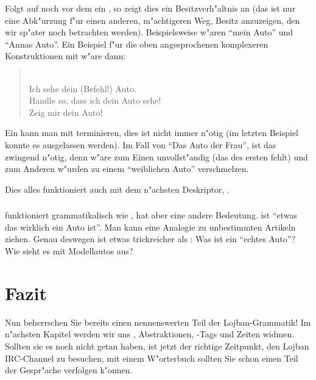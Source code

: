 Folgt auf  noch vor dem  ein , so zeigt dies ein Besitzverh"altnis an (das ist nur eine Abk"urzung f"ur einen
anderen, m"achtigeren Weg, Besitz anzuzeigen, den wir sp"ater noch betrachten werden). Beispielsweise w"aren  ``mein Auto'' und
 ``Annas Auto''. 
Ein Beispiel f"ur die oben angesprochenen komplexeren Konstruktionen mit  w"are dann:
\begin{quote}
 \\
Ich sehe dein (Befehl!) Auto. \\
Handle so, dass ich dein Auto sehe! \\
Zeig mir dein Auto!
\end{quote}

Ein  kann man mit  terminieren, dies ist nicht immer n"otig (im letzten Beispiel konnte es ausgelassen werden).
Im Fall von ``Das Auto der Frau'',  ist das  zwingend n"otig, denn  w"are zum Einen
unvollst"andig (das  des ersten  fehlt) und zum Anderen w"urden  zu einem ``weiblichen Auto'' verschmelzen.

Dies alles funktioniert auch mit dem n"achsten Deskriptor, .

\subsubsection{}
 funktioniert grammatikalisch wie , hat aber eine andere Bedeutung.  ist ``etwas das wirklich ein Auto ist''. Man kann eine Analogie zu unbestimmten Artikeln ziehen.
Genau deswegen ist  etwas trickreicher als : Was ist ein ``echtes Auto''? Wie sieht es mit Modellautos aus?

\section{Fazit}
Nun beherrschen Sie bereits einen nennenswerten Teil der Lojban-Grammatik! Im n"achsten Kapitel werden wir uns , Abstraktionen,
-Tags und Zeiten widmen. Sollten sie es noch nicht getan haben, ist jetzt der richtige Zeitpunkt, den Lojban IRC-Channel zu besuchen, mit einem W"orterbuch sollten Sie schon einen Teil der Gespr"ache verfolgen k"onnen.
